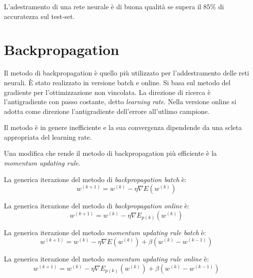 L'adestramento di una rete neurale è di buona qualità se supera il 85\% di accuratezza sul test-set.


\section{Backpropagation}
\label{sec:neural-networks.learning.backpropagation}
Il metodo di backpropagation è quello più utilizzato per l'addestramento delle reti neurali. È stato realizzato in versione batch e online. Si basa sul metodo del gradiente per l'ottimizzazione non vincolata. La direzione di ricerca è l'antigradiente con passo costante, detto \textit{learning rate}. Nella versione online si adotta come direzione l'antigradiente dell'errore all'utlimo campione.

Il metodo è in genere inefficiente e la sua convergenza dipendende da una scleta appropriata del learning rate.

Una modifica che rende il metodo di backpropagation più efficiente è la \textit{momentum updating rule}.

La generica iterazione del metodo di \textit{backpropagation batch} è:
\begin{equation}
  \label{eqn:neural-networks.learning.bp.batch}
  w^{(k+1)}=w^{(k)}-\eta\nabla E(w^{(k)})
\end{equation}

La generica iterazione del metodo di \textit{backpropagation online} è:
\begin{equation}
  \label{eqn:neural-networks.learning.bp.online}
  w^{(k+1)}=w^{(k)}-\eta\nabla E_{p(k)}(w^{(k)})
\end{equation}

La generica iterazione del metodo \textit{momentum updating rule batch} è:
\begin{equation}
  \label{eqn:neural-networks.learning.mur.batch}
  w^{(k+1)}=w^{(k)}-\eta\nabla E(w^{(k)})+\beta(w^{(k)}-w^{(k-1)})
\end{equation}

La generica iterazione del metodo \textit{momentum updating rule online} è:
\begin{equation}
  \label{eqn:neural-networks.learning.mur.online}
  w^{(k+1)}=w^{(k)}-\eta\nabla E_{p(k)}(w^{(k)})+\beta(w^{(k)}-w^{(k-1)})
\end{equation}
